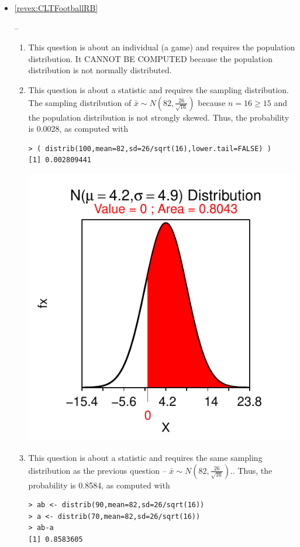 \documentclass[10pt,openany]{book}\usepackage[]{graphicx}\usepackage[]{color}
\makeatletter
\newenvironment{kframe}{%
 \def\at@end@of@kframe{}%
 \ifinner\ifhmode%
  \def\at@end@of@kframe{\end{minipage}}%
  \begin{minipage}{\columnwidth}%
 \fi\fi%
 \def\FrameCommand##1{\hskip\@totalleftmargin \hskip-\fboxsep
 \colorbox{shadecolor}{##1}\hskip-\fboxsep
     \hskip-\linewidth \hskip-\@totalleftmargin \hskip\columnwidth}%
 \MakeFramed {\advance\hsize-\width
   \@totalleftmargin\z@ \linewidth\hsize
   \@setminipage}}%
 {\par\unskip\endMakeFramed%
 \at@end@of@kframe}
\newenvironment{knitrout}{}{} %
\makeatother
\begin{document}
\begin{itemize}
\begin{enumerate}
\begin{knitrout}
\end{knitrout}
    \end{enumerate}
  \item \hypertarget{ans:CLTFootballRB}{\ref{revex:CLTFootballRB}} --
    \begin{enumerate}
       \item This question is about an individual (a game) and requires the population distribution. It CANNOT BE COMPUTED because the population distribution is not normally distributed.
       \item This question is about a statistic and requires the sampling distribution.  The sampling distribution of $\bar{x}\sim N(82,\frac{26}{\sqrt{16}})$ because $n=16 \geq 15$ and the population distribution is not strongly skewed.  Thus, the probability is 0.0028, as computed with
\begin{knitrout}
\color{fgcolor}\begin{kframe}
\begin{verbatim}
> ( distrib(100,mean=82,sd=26/sqrt(16),lower.tail=FALSE) )
[1] 0.002809441
\end{verbatim}
\end{kframe}

{\centering \includegraphics[width=.4\linewidth]{Figs/unnamed-chunk-314-1} 

}



\end{knitrout}
       \item This question is about a statistic and requires the same sampling distribution as the previous question --  $\bar{x}\sim N(82,\frac{26}{\sqrt{16}})$..  Thus, the probability is 0.8584, as computed with
\begin{knitrout}
\color{fgcolor}\begin{kframe}
\begin{verbatim}
> ab <- distrib(90,mean=82,sd=26/sqrt(16))
> a <- distrib(70,mean=82,sd=26/sqrt(16))
> ab-a
[1] 0.8583605
\end{verbatim}
\end{kframe}


\end{knitrout}
\end{enumerate}
\end{itemize}
\end{document}
